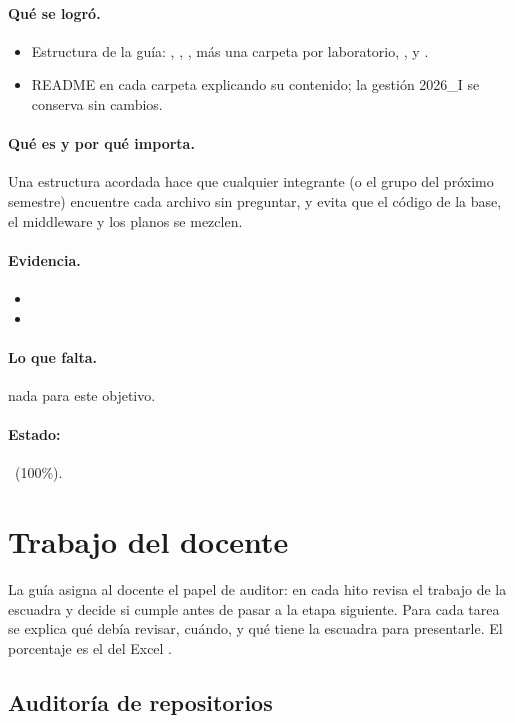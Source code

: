 \documentclass[a4paper,11pt]{article}
\begin{document}
\paragraph{Qué se logró.}
\begin{itemize}
\item Estructura de la guía: , , , más una carpeta por laboratorio, ,  y .
\item README en cada carpeta explicando su contenido; la gestión 2026\_I se conserva sin cambios.
\end{itemize}
\paragraph{Qué es y por qué importa.} Una estructura acordada hace que cualquier integrante (o el grupo del próximo semestre) encuentre cada archivo sin preguntar, y evita que el código de la base, el middleware y los planos se mezclen.
\paragraph{Evidencia.}
\begin{itemize}\small
\item {}
\item {}
\end{itemize}
\paragraph{Lo que falta.} nada para este objetivo.
\paragraph{Estado:} \cumple~(100\%).
\section{Trabajo del docente}
La guía asigna al docente el papel de auditor: en cada hito revisa el trabajo de la escuadra y decide si cumple antes de pasar a la etapa siguiente. Para cada tarea se explica qué debía revisar, cuándo, y qué tiene la escuadra para presentarle. El porcentaje es el del Excel .
\subsection{Auditoría de repositorios}
\end{document}
